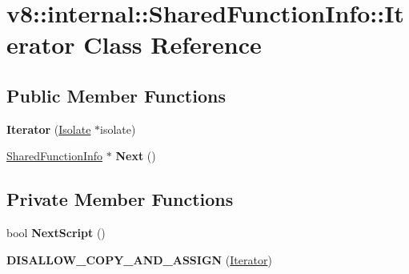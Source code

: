 \hypertarget{classv8_1_1internal_1_1_shared_function_info_1_1_iterator}{}\section{v8\+:\+:internal\+:\+:Shared\+Function\+Info\+:\+:Iterator Class Reference}
\label{classv8_1_1internal_1_1_shared_function_info_1_1_iterator}
\subsection*{Public Member Functions}
\begin{DoxyCompactItemize}
\item 
{\bfseries Iterator} (\hyperlink{classv8_1_1internal_1_1_isolate}{Isolate} $\ast$isolate)\hypertarget{classv8_1_1internal_1_1_shared_function_info_1_1_iterator_aa6f63d54fe0c54be3da8e9a6f73eb56d}{}\label{classv8_1_1internal_1_1_shared_function_info_1_1_iterator_aa6f63d54fe0c54be3da8e9a6f73eb56d}

\item 
\hyperlink{classv8_1_1internal_1_1_shared_function_info}{Shared\+Function\+Info} $\ast$ {\bfseries Next} ()\hypertarget{classv8_1_1internal_1_1_shared_function_info_1_1_iterator_a724e8b6047f93192810f842ecdad3a47}{}\label{classv8_1_1internal_1_1_shared_function_info_1_1_iterator_a724e8b6047f93192810f842ecdad3a47}

\end{DoxyCompactItemize}
\subsection*{Private Member Functions}
\begin{DoxyCompactItemize}
\item 
bool {\bfseries Next\+Script} ()\hypertarget{classv8_1_1internal_1_1_shared_function_info_1_1_iterator_a24a59265fdc99c9174df82b609dd82b4}{}\label{classv8_1_1internal_1_1_shared_function_info_1_1_iterator_a24a59265fdc99c9174df82b609dd82b4}

\item 
{\bfseries D\+I\+S\+A\+L\+L\+O\+W\+\_\+\+C\+O\+P\+Y\+\_\+\+A\+N\+D\+\_\+\+A\+S\+S\+I\+GN} (\hyperlink{classv8_1_1internal_1_1_shared_function_info_1_1_iterator}{Iterator})\hypertarget{classv8_1_1internal_1_1_shared_function_info_1_1_iterator_ab92da7650e1b822b0eaec5011c8db1ab}{}\label{classv8_1_1internal_1_1_shared_function_info_1_1_iterator_ab92da7650e1b822b0eaec5011c8db1ab}

\end{DoxyCompactItemize}
